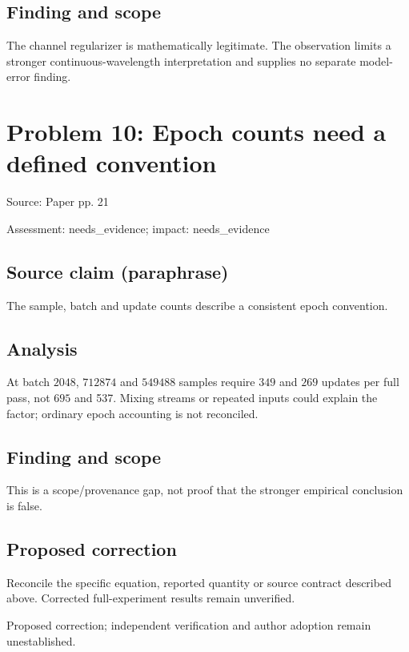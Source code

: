 \documentclass[11pt]{article}
\begin{document}
\subsection*{Finding and scope}

The channel regularizer is mathematically legitimate. The observation limits a stronger continuous-wavelength interpretation and supplies no separate model-error finding.

\section*{Problem 10: Epoch counts need a defined convention}

Source: Paper pp. 21

Assessment: needs\_evidence; impact: needs\_evidence

\subsection*{Source claim (paraphrase)}

The sample, batch and update counts describe a consistent epoch convention.

\subsection*{Analysis}

At batch \(2048\), \(712874\) and \(549488\) samples require \(349\) and \(269\) updates per full pass, not \(695\) and 537. Mixing streams or repeated inputs could explain the factor; ordinary epoch accounting is not reconciled.

\subsection*{Finding and scope}

This is a scope/provenance gap, not proof that the stronger empirical conclusion is false.

\subsection*{Proposed correction}

Reconcile the specific equation, reported quantity or source contract described above. Corrected full-experiment results remain unverified.

Proposed correction; independent verification and author adoption remain unestablished.
\end{document}
